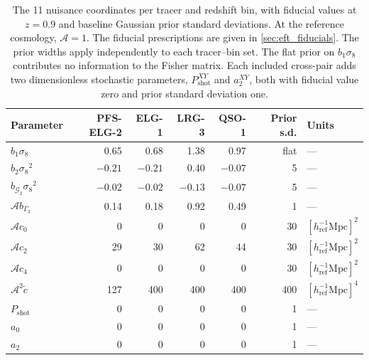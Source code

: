 \documentclass[a4paper,11pt]{article}
\newcommand{\revchange}[1]{{\color{RevisionColor}#1}}
\newcommand{\se}{\ensuremath{\sigma_{8}}\xspace}
\newcommand{\G}{\mathcal{G}}
\newcommand{\ctilde}{\tilde{c}}
\newcommand{\Pshot}{P_{\mathrm{shot}}}
\begin{document}
\begin{table}[t]
\centering
\small
\begin{tabular}{lrrrrrl}
\hline
Parameter & \revchange{PFS-ELG-2} & \revchange{ELG-1} & \revchange{LRG-3} & \revchange{QSO-1} & \revchange{Prior s.d.} & Units \\
\hline
$b_1\se$ & 0.65 & 0.68 & 1.38 & 0.97 & \revchange{flat} & --- \\
$b_2\se^2$ & $-0.21$ & $-0.21$ & 0.40 & $-0.07$ & \revchange{5} & --- \\
$b_{\G_2}\se^2$ & $-0.02$ & $-0.02$ & $-0.13$ & $-0.07$ & \revchange{5} & --- \\
\revchange{$\mathcal A b_{\Gamma_3}$} & \revchange{0.14} & \revchange{0.18} & \revchange{0.92} & \revchange{0.49} & \revchange{1} & \revchange{---} \\
\revchange{$\mathcal A c_0$} & \revchange{0} & \revchange{0} & \revchange{0} & \revchange{0} & \revchange{30} & \revchange{$[h_{\mathrm{ref}}^{-1}\mathrm{Mpc}]^2$} \\
\revchange{$\mathcal A c_2$} & \revchange{29} & \revchange{30} & \revchange{62} & \revchange{44} & \revchange{30} & \revchange{$[h_{\mathrm{ref}}^{-1}\mathrm{Mpc}]^2$} \\
\revchange{$\mathcal A c_4$} & \revchange{0} & \revchange{0} & \revchange{0} & \revchange{0} & \revchange{30} & \revchange{$[h_{\mathrm{ref}}^{-1}\mathrm{Mpc}]^2$} \\
\revchange{$\mathcal A^2\ctilde$} & \revchange{127} & \revchange{400} & \revchange{400} & \revchange{400} & \revchange{400} & \revchange{$[h_{\mathrm{ref}}^{-1}\mathrm{Mpc}]^4$} \\
$\Pshot$ & 0 & 0 & 0 & 0 & \revchange{1} & --- \\
$a_0$ & 0 & 0 & 0 & 0 & \revchange{1} & --- \\
$a_2$ & 0 & 0 & 0 & 0 & \revchange{1} & --- \\
\hline
\end{tabular}
\caption{\color{RevisionColor}The 11 nuisance coordinates per tracer and redshift bin,
with fiducial values at $z=0.9$ and baseline Gaussian prior standard
deviations. At the reference cosmology, $\mathcal A=1$.
The fiducial prescriptions are given in \cref{sec:eft_fiducials}.
The prior widths apply independently to each tracer--bin set.
The flat prior on $b_1\se$ contributes no information to the Fisher matrix.
Each included cross-pair adds two dimensionless stochastic
parameters, $\Pshot^{XY}$ and $a_2^{XY}$, both with fiducial
value zero and prior standard deviation one.}
\label{tab:eft_params}
\end{table}
\end{document}
